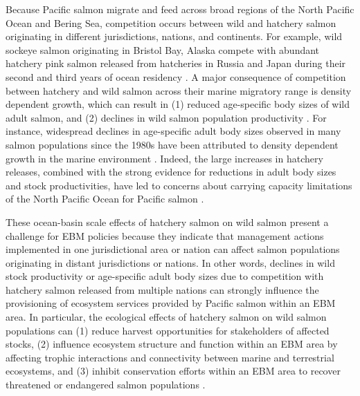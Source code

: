 Because Pacific salmon migrate and feed across broad regions of the
North Pacific Ocean and Bering Sea, competition occurs between wild and
hatchery salmon originating in different jurisdictions, nations, and
continents. For example, wild sockeye salmon originating in Bristol Bay,
Alaska compete with abundant hatchery pink salmon released from
hatcheries in Russia and Japan during their second and third years of
ocean residency \citep{Ruggerone2003a}. A major consequence of
competition between hatchery and wild salmon across their marine
migratory range is density dependent growth, which can result in (1)
reduced age-specific body sizes of wild adult salmon, and (2) declines
in wild salmon population productivity
\citep{Ruggerone2015, Ruggerone2003a}. For instance, widespread declines
in age-specific adult body sizes observed in many salmon populations
since the 1980s have been attributed to density dependent growth in the
marine environment \citep{Ricker1981a, Ishida1993a, Pyper1999a}. Indeed,
the large increases in hatchery releases, combined with the strong
evidence for reductions in adult body sizes and stock productivities,
have led to concerns about carrying capacity limitations of the North
Pacific Ocean for Pacific salmon \citep{Pearcy1999a, Nielsen2009a}.

These ocean-basin scale effects of hatchery salmon on wild salmon
present a challenge for EBM policies because they indicate that
management actions implemented in one jurisdictional area or nation can
affect salmon populations originating in distant jurisdictions or
nations. In other words, declines in wild stock productivity or
age-specific adult body sizes due to competition with hatchery salmon
released from multiple nations can strongly influence the provisioning
of ecosystem services provided by Pacific salmon within an EBM area. In
particular, the ecological effects of hatchery salmon on wild salmon
populations can (1) reduce harvest opportunities for stakeholders of
affected stocks, (2) influence ecosystem structure and function within
an EBM area by affecting trophic interactions and connectivity between
marine and terrestrial ecosystems, and (3) inhibit conservation efforts
within an EBM area to recover threatened or endangered salmon
populations \citep{Ruggerone2003a, Nielsen2009a}.

